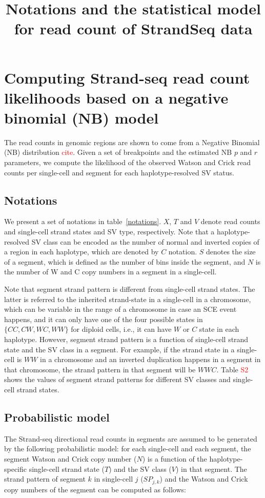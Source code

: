 \documentclass[12pt]{article}
\title{Notations and the statistical model for read count of StrandSeq data}
\renewcommand{\j}{j} %
\newcommand{\X}{X} %
\renewcommand{\k}{k} %
\newcommand{\T}{T} %
\newcommand{\V}{V} %
\begin{document}
\maketitle

\section{Computing Strand-seq read count likelihoods based on a negative binomial (NB) model}

The read counts in genomic regions are shown to come from a Negative Binomial (NB) distribution \textcolor{red}{cite}. %
Given a set of breakpoints and the estimated NB $p$ and $r$ parameters, we compute the likelihood of the observed Watson and Crick read counts per single-cell and segment for each haplotype-resolved SV status.

\subsection{Notations}
We present a set of notations in table~\ref{notations}. $\X$, $\T$ and $\V$ denote read counts and single-cell strand states and SV type, respectively.
Note that a haplotype-resolved SV class can be encoded as the number of normal and inverted copies of a region in each haplotype, which are denoted by $C$ notation.
$S$ denotes the size of a segment, which is defined as the number of bins inside the segment, and $N$ is the number of W and C copy numbers in a segment in a single-cell.

Note that segment strand pattern is different from single-cell strand states.
The latter is referred to the inherited strand-state in a single-cell in a chromosome, which can be variable in the range of a chromosome in case an SCE event happens, and it can only have one of the four possible states in $\{CC,CW,WC,WW\}$ for diploid cells, i.e., it can have $W$ or $C$ state in each haplotype.
However, segment strand pattern is a function of single-cell strand state and the SV class in a segment.
For example, if the strand state in a single-cell is $WW$ in a chromosome and an inverted duplication happens in a segment in that chromosome, the strand pattern in that segment will be $WWC$.
Table \textcolor{red}{S2} shows the values of segment strand patterns for different SV classes and single-cell strand states.

\subsection{Probabilistic model}
The Strand-seq directional read counts in segments are assumed to be generated by the following probabilistic model:
for each single-cell and each segment, the segment Watson and Crick copy number ($N$) is a function of the haplotype-specific single-cell strand state ($T$) and the SV class ($V$) in that segment. The strand pattern of segment $\k$ in single-cell $\j$ ($SP_{\j,\k}$) and the Watson and Crick copy numbers of the segment can be computed as follows:
\end{document}
